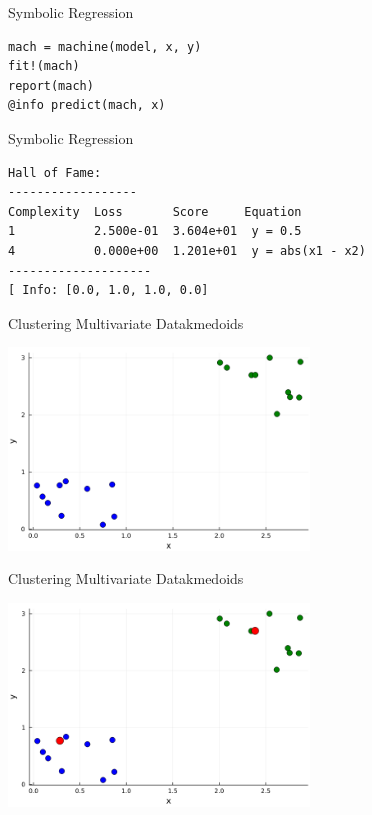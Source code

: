 \documentclass[11pt]{beamer}
\begin{document}
\begin{frame}[fragile]{Symbolic Regression}
\begin{lstlisting}
mach = machine(model, x, y)
fit!(mach)
report(mach)
@info predict(mach, x)
\end{lstlisting}
\end{frame}


\begin{frame}[fragile]{Symbolic Regression}
\begin{lstlisting}
Hall of Fame:   
------------------                                                                                                                                    Complexity  Loss       Score     Equation                                                                                                                1           2.500e-01  3.604e+01  y = 0.5                                                                                                                4           0.000e+00  1.201e+01  y = abs(x1 - x2)
--------------------                                                                                                       
[ Info: [0.0, 1.0, 1.0, 0.0]

\end{lstlisting}
\end{frame}



\begin{frame}[fragile]{Clustering Multivariate Data}{kmedoids}
	\begin{center}
		\includegraphics[width=8cm]{images/kmedoids1.png}
	\end{center}
\end{frame}

\begin{frame}[fragile]{Clustering Multivariate Data}{kmedoids}
	\begin{center}
		\includegraphics[width=8cm]{images/kmedoids2.png}
	\end{center}
\end{frame}
\end{document}
